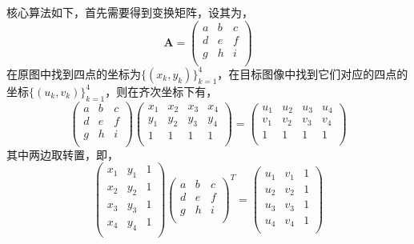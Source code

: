 \documentclass[12pt,a4paper]{article}
\begin{document}
核心算法如下，首先需要得到变换矩阵，设其为，
\begin{equation}
    \boldsymbol{A} = \left(
    \begin{matrix}
        a & b & c\\
        d & e & f\\
        g & h & i\\
    \end{matrix}
    \right)
\end{equation}
在原图中找到四点的坐标为$\{(x_k, y_k)\}_{k=1}^4$，在目标图像中找到它们对应的四点的坐标$\{(u_k, v_k)\}_{k=1}^4$，则在齐次坐标下有，
\begin{equation}
    \left(
    \begin{matrix}
        a & b & c\\
        d & e & f\\
        g & h & i\\
    \end{matrix}
    \right)
    \left(
    \begin{matrix}
        x_1 & x_2 & x_3 & x_4\\
        y_1 & y_2 & y_3 & y_4\\
        1 & 1 & 1 & 1\\
    \end{matrix}
    \right)
    = \left(
    \begin{matrix}
        u_1 & u_2 & u_3 & u_4\\
        v_1 & v_2 & v_3 & v_4\\
        1 & 1 & 1 & 1\\
    \end{matrix}
    \right)
\end{equation}
其中两边取转置，即，
\begin{equation}
    \left(
    \begin{matrix}
        x_1 & y_1 & 1\\
        x_2 & y_2 & 1\\
        x_3 & y_3 & 1\\
        x_4 & y_4 & 1\\
    \end{matrix}
    \right)
    \left(
    \begin{matrix}
        a & b & c\\
        d & e & f\\
        g & h & i\\
    \end{matrix}
    \right)^T
    = \left(
    \begin{matrix}
        u_1 & v_1 & 1\\
        u_2 & v_2 & 1\\
        u_3 & v_3 & 1\\
        u_4 & v_4 & 1\\
    \end{matrix}
    \right)
\end{equation}
\end{document}
